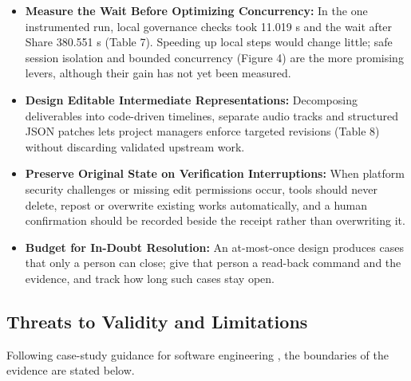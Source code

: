 \documentclass[11pt,a4paper]{article}
\theoremstyle{definition}
\begin{document}
\begin{itemize}[leftmargin=1.8em]
    \item \textbf{Measure the Wait Before Optimizing Concurrency:} In the one instrumented run, local governance checks took 11.019 s and the wait after Share 380.551 s (Table 7). Speeding up local steps would change little; safe session isolation and bounded concurrency (Figure 4) are the more promising levers, although their gain has not yet been measured.
    \item \textbf{Design Editable Intermediate Representations:} Decomposing deliverables into code-driven timelines, separate audio tracks and structured JSON patches lets project managers enforce targeted revisions (Table 8) without discarding validated upstream work.
    \item \textbf{Preserve Original State on Verification Interruptions:} When platform security challenges or missing edit permissions occur, tools should never delete, repost or overwrite existing works automatically, and a human confirmation should be recorded beside the receipt rather than overwriting it.
    \item \textbf{Budget for In-Doubt Resolution:} An at-most-once design produces cases that only a person can close; give that person a read-back command and the evidence, and track how long such cases stay open.
\end{itemize}

\subsection{Threats to Validity and Limitations}
\label{sec:7.4}

Following case-study guidance for software engineering \citep{Runeson2009}, the boundaries of the evidence are stated below.
\end{document}
